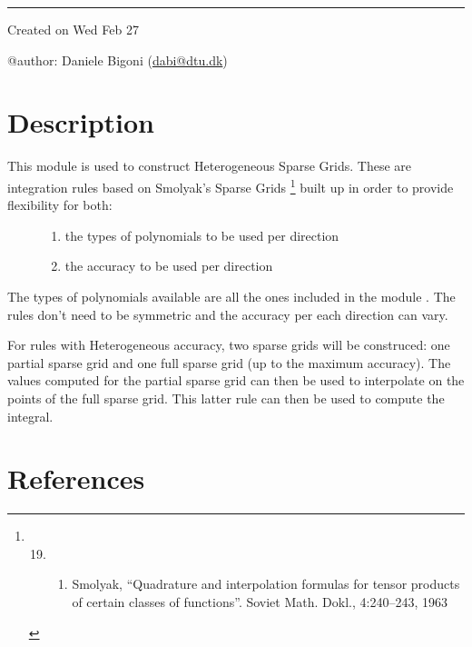 \documentclass[letterpaper,10pt,english]{sphinxmanual}
\begin{document}
\bigskip\hrule{}\bigskip


Created on Wed Feb 27

@author: Daniele Bigoni (\href{mailto:dabi@dtu.dk}{dabi@dtu.dk})


\chapter{Description}
\label{index:id22}\begin{description}
\item[{This module is used to construct Heterogeneous Sparse Grids. These are integration rules based on Smolyak's Sparse Grids \footnote{\begin{enumerate}
\setcounter{enumi}{18}
\item {} \begin{enumerate}
\item {} 
Smolyak, ``Quadrature and interpolation formulas for tensor products of certain classes of functions''. Soviet Math. Dokl., 4:240–243, 1963

\end{enumerate}

\end{enumerate}
} built up in order to provide flexibility for both:}] \leavevmode\begin{enumerate}
\item {} 
the types of polynomials to be used per direction

\item {} 
the accuracy to be used per direction

\end{enumerate}

\end{description}

The types of polynomials available are all the ones included in the module . The rules don't need to be symmetric and the accuracy per each direction can vary.

For rules with Heterogeneous accuracy, two sparse grids will be construced: one partial sparse grid and one full sparse grid (up to the maximum accuracy). The values computed for the partial sparse grid can then be used to interpolate on the points of the full sparse grid. This latter rule can then be used to compute the integral.


\chapter{References}
\label{index:id24}
\end{document}
